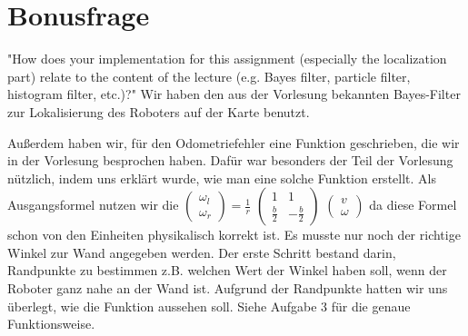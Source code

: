 \newpage
\section{Bonusfrage}
"How does your implementation for this assignment (especially the localization part) relate to the content of the lecture (e.g. Bayes filter, particle filter, histogram filter, etc.)?"
Wir haben den aus der Vorlesung bekannten Bayes-Filter zur Lokalisierung des Roboters auf der Karte benutzt.

Au{\ss}erdem haben wir, f\"ur den Odometriefehler eine Funktion geschrieben, die wir in der Vorlesung besprochen haben.
Daf\"ur war besonders der Teil der Vorlesung n\"utzlich, indem uns erkl\"art wurde, wie man eine solche Funktion erstellt.
Als Ausgangsformel nutzen wir die
$\left(\begin{array}{c} \omega_l \\ \omega_r \end{array}\right) = \frac{1}{r}$
$\left(\begin{array}{rr} 1 & 1 \\ \frac{b}{2} & -\frac{b}{2} \end{array} \right)$
$\left(\begin{array}{c} v \\ \omega \end{array}\right)$
da diese Formel schon von den Einheiten physikalisch korrekt ist.
Es musste nur noch der richtige Winkel zur Wand angegeben werden.
Der erste Schritt bestand darin, Randpunkte zu bestimmen
z.B. welchen Wert der Winkel haben soll, wenn der Roboter ganz nahe an der Wand ist.
Aufgrund der Randpunkte hatten wir uns \"uberlegt, wie die Funktion aussehen soll.
Siehe Aufgabe 3 f\"ur die genaue Funktionsweise.
